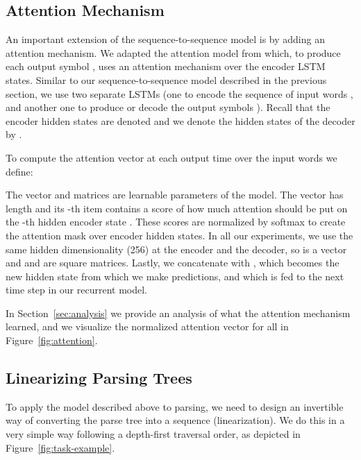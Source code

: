 \documentclass{article} \usepackage{nips15submit_e,times}
\begin{document}
\subsection{Attention Mechanism}
\label{sec:attention}
An important extension of the sequence-to-sequence model is by adding an
attention mechanism. We adapted the attention model from \cite{bahdanau2014neural}
which, to produce each output symbol , uses an attention mechanism over
the encoder LSTM states. Similar to our sequence-to-sequence model described
in the previous section, we use two separate LSTMs (one to encode the sequence
of input words , and another one to produce or decode the output
symbols ). Recall that the encoder hidden states are denoted
 and we denote the hidden states of the decoder by
.

To compute the attention vector at each output time  over the input
words  we define:

The vector  and matrices  are learnable parameters of the model.
The vector  has length  and its -th item contains a score of
how much attention should be put on the -th hidden encoder state .
These scores are normalized by softmax to create the attention mask  over
encoder hidden states.
In all our experiments, we use the same hidden dimensionality (256) at
the encoder and the decoder, so  is a vector and  and  are
square matrices. Lastly, we concatenate  with , which becomes
the new hidden state from which we make predictions, and which is fed to
the next time step in our recurrent model.

In Section~\ref{sec:analysis} we provide an analysis of what the attention
mechanism learned, and we visualize the normalized attention vector  for
all  in Figure~\ref{fig:attention}.

\subsection{Linearizing Parsing Trees}

To apply the model described above to parsing, we need to design an
invertible way of converting the parse tree into a sequence (linearization).
We do this in a very simple way following a depth-first
traversal order, as depicted in Figure~\ref{fig:task-example}.
\end{document}
